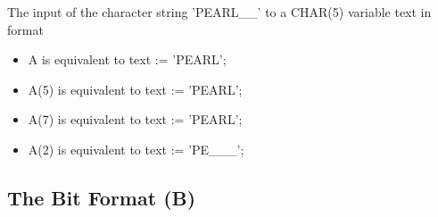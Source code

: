 The input of the character string 'PEARL\_\_' to a CHAR(5) variable text in
format

\begin{itemize}
\item A is equivalent to text := 'PEARL';
\item A(5) is equivalent to text := 'PEARL';
\item A(7) is equivalent to text := 'PEARL';
\item A(2) is equivalent to text := 'PE\_\_\_';
\end{itemize}



\subsection{The Bit Format (B)}    %
\label{sec_dation_b_format}

